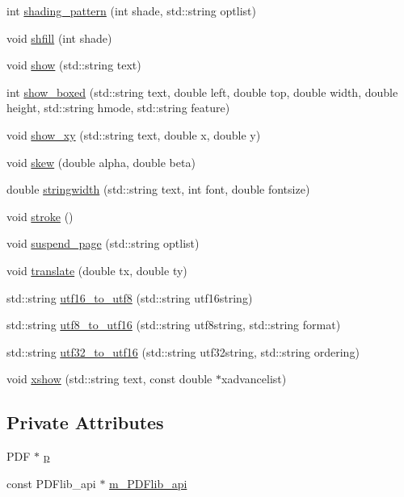 \begin{DoxyCompactItemize}
int \hyperlink{classPDFlib_af7936c5fdacd6363b41811f02e6bead9}{shading\+\_\+pattern} (int shade, std\+::string optlist)
\item 
void \hyperlink{classPDFlib_acc1378fc57dce8d3fbdd218aaa95f8dc}{shfill} (int shade)
\item 
void \hyperlink{classPDFlib_aaa7923ae29e03873a5ef1e80156b75c6}{show} (std\+::string text)
\item 
int \hyperlink{classPDFlib_af282c4e9f187a86ac103ec9438722040}{show\+\_\+boxed} (std\+::string text, double left, double top, double width, double height, std\+::string hmode, std\+::string feature)
\item 
void \hyperlink{classPDFlib_a28f2a9cae7188472df3a0d75e7bac6ac}{show\+\_\+xy} (std\+::string text, double x, double y)
\item 
void \hyperlink{classPDFlib_a66323e008c1980539c58a2647af31b1a}{skew} (double alpha, double beta)
\item 
double \hyperlink{classPDFlib_afd8b4b2ff6fa254cc386047bddfbede1}{stringwidth} (std\+::string text, int font, double fontsize)
\item 
void \hyperlink{classPDFlib_ab212bd6e1bc82f8f00f807438218bc5d}{stroke} ()
\item 
void \hyperlink{classPDFlib_ac047054d3779c38b144b3f5dbd6b81b8}{suspend\+\_\+page} (std\+::string optlist)
\item 
void \hyperlink{classPDFlib_abcecfeb7a7e76092ffe5e222dbcbea25}{translate} (double tx, double ty)
\item 
std\+::string \hyperlink{classPDFlib_acd5ccd9fb08470613c9bbb976995a034}{utf16\+\_\+to\+\_\+utf8} (std\+::string utf16string)
\item 
std\+::string \hyperlink{classPDFlib_af94465908bf96f42f2746734205ea70d}{utf8\+\_\+to\+\_\+utf16} (std\+::string utf8string, std\+::string format)
\item 
std\+::string \hyperlink{classPDFlib_a2fc66f507a5c98e6dfffd3dc7015b381}{utf32\+\_\+to\+\_\+utf16} (std\+::string utf32string, std\+::string ordering)
\item 
void \hyperlink{classPDFlib_aa4dc2e0ce0aed19151b9bc7ea8824e0f}{xshow} (std\+::string text, const double $\ast$xadvancelist)
\end{DoxyCompactItemize}
\subsection*{Private Attributes}
\begin{DoxyCompactItemize}
\item 
P\+D\+F $\ast$ \hyperlink{classPDFlib_a9ea3cf3bfba7ad4727622bf31ef632cb}{p}
\item 
const P\+D\+Flib\+\_\+api $\ast$ \hyperlink{classPDFlib_a65d13899e72570340d47e3766a8d8e92}{m\+\_\+\+P\+D\+Flib\+\_\+api}
\end{DoxyCompactItemize}


